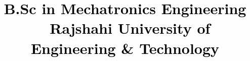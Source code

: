 \title{{\fontsize{10}{10}\selectfont \textcolor{black}{B.Sc in Mechatronics Engineering }}\\
\textcolor{white}{.} \hfill {\fontsize{10}{10}\selectfont \textcolor{black}{Rajshahi University of Engineering \& Technology
}}}


\address{120 Kapasgola,Chawkbazer, Chittagong-4000, Bangladesh}%





